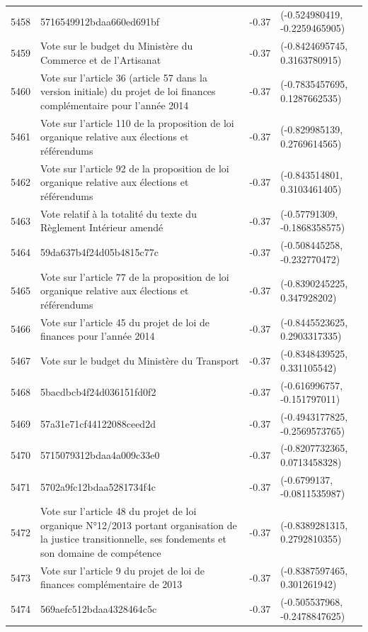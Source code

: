 \begin{table}[ht]
\begin{tabular}{rlrl}
  5458 & 5716549912bdaa660ed691bf & -0.37 & (-0.524980419, -0.2259465905) \\ 
  5459 & Vote sur le budget du Ministère du Commerce et de l'Artisanat & -0.37 & (-0.8424695745, 0.3163780915) \\ 
  5460 & Vote sur l'article 36 (article 57 dans la version initiale) du projet de loi finances complémentaire pour l'année 2014 & -0.37 & (-0.7835457695, 0.1287662535) \\ 
  5461 & Vote sur l'article 110 de la proposition de loi organique relative aux élections et référendums & -0.37 & (-0.829985139, 0.2769614565) \\ 
  5462 & Vote sur l'article 92 de la proposition de loi organique relative aux élections et référendums & -0.37 & (-0.843514801, 0.3103461405) \\ 
  5463 & Vote relatif à la totalité du texte du Règlement Intérieur amendé & -0.37 & (-0.57791309, -0.1868358575) \\ 
  5464 & 59da637b4f24d05b4815c77c & -0.37 & (-0.508445258, -0.232770472) \\ 
  5465 & Vote sur l'article 77 de la proposition de loi organique relative aux élections et référendums & -0.37 & (-0.8390245225, 0.347928202) \\ 
  5466 & Vote sur l'article 45 du projet de loi de finances pour l'année 2014 & -0.37 & (-0.8445523625, 0.2903317335) \\ 
  5467 & Vote sur le budget du Ministère du Transport & -0.37 & (-0.8348439525, 0.331105542) \\ 
  5468 & 5bacdbcb4f24d036151fd0f2 & -0.37 & (-0.616996757, -0.151797011) \\ 
  5469 & 57a31e71cf44122088ceed2d & -0.37 & (-0.4943177825, -0.2569573765) \\ 
  5470 & 5715079312bdaa4a009c33e0 & -0.37 & (-0.8207732365, 0.0713458328) \\ 
  5471 & 5702a9fc12bdaa5281734f4c & -0.37 & (-0.6799137, -0.0811535987) \\ 
  5472 & Vote sur l'article 48 du projet de loi organique N°12/2013 portant organisation de la justice transitionnelle, ses fondements et son domaine de compétence & -0.37 & (-0.8389281315, 0.2792810355) \\ 
  5473 & Vote sur l'article 9 du projet de loi de finances complémentaire de 2013 & -0.37 & (-0.8387597465, 0.301261942) \\ 
  5474 & 569aefc512bdaa4328464c5c & -0.37 & (-0.505537968, -0.2478847625) \\ 

\end{tabular}
\end{table}
